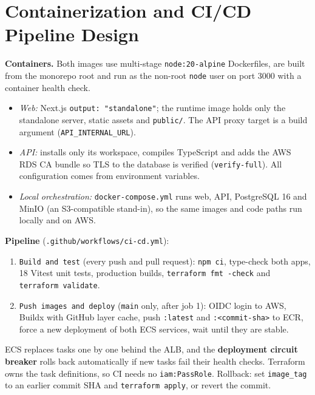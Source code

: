 \documentclass[11pt,a4paper]{article}
\begin{document}
\section{Containerization and CI/CD Pipeline Design}
\textbf{Containers.} Both images use multi-stage \texttt{node:20-alpine}
Dockerfiles, are built from the monorepo root and run as the non-root
\texttt{node} user on port 3000 with a container health check.
\begin{itemize}
  \item \emph{Web:} Next.js \texttt{output: "standalone"}; the runtime image
        holds only the standalone server, static assets and \texttt{public/}.
        The API proxy target is a build argument (\texttt{API\_INTERNAL\_URL}).
  \item \emph{API:} installs only its workspace, compiles TypeScript and adds the
        AWS RDS CA bundle so TLS to the database is verified
        (\texttt{verify-full}). All configuration
        comes from environment variables.
  \item \emph{Local orchestration:} \texttt{docker-compose.yml} runs web, API,
        PostgreSQL 16 and MinIO (an S3-compatible stand-in), so the same images
        and code paths run locally and on AWS.
\end{itemize}

\textbf{Pipeline} (\texttt{.github/workflows/ci-cd.yml}):
\begin{enumerate}
  \item \texttt{Build and test} (every push and pull request): \texttt{npm ci},
        type-check both apps, 18 Vitest unit tests, production builds,
        \texttt{terraform fmt -check} and \texttt{terraform validate}.
  \item \texttt{Push images and deploy} (\texttt{main} only, after job 1):
        OIDC login to AWS, Buildx with GitHub layer cache, push
        \texttt{:latest} and \texttt{:<commit-sha>} to ECR, force a new
        deployment of both ECS services, wait until they are stable.
\end{enumerate}
ECS replaces tasks one by one behind the ALB, and the \textbf{deployment
circuit breaker} rolls back automatically if new tasks fail their health
checks. Terraform owns the task definitions, so CI needs no
\texttt{iam:PassRole}. Rollback: set \texttt{image\_tag} to an earlier commit
SHA and \texttt{terraform apply}, or revert the commit.

\end{document}
